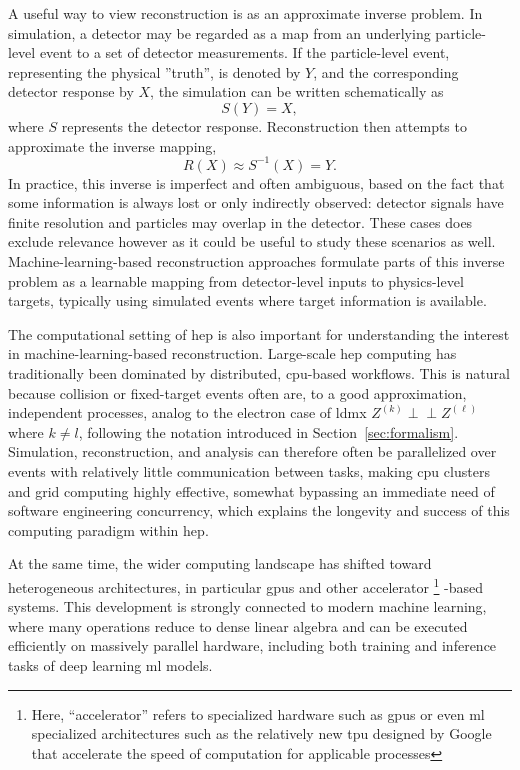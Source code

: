 A useful way to view reconstruction is as an approximate inverse problem. In simulation, a detector may be regarded as a map from an underlying particle-level event to a set of detector measurements. If the particle-level event, representing the physical ''truth'', is denoted by \(Y\), and the corresponding detector response by \(X\), the simulation can be written schematically as
\begin{equation}
    S(Y) = X ,
\end{equation}
where \(S\) represents the detector response. Reconstruction then attempts to approximate the inverse mapping,
\begin{equation}
    R(X) \approx S^{-1}(X) = Y .
\end{equation}
In practice, this inverse is imperfect and often ambiguous, based on the fact that some information is always lost or only indirectly observed: detector signals have finite resolution and particles may overlap in the detector. These cases does exclude relevance however as it could be useful to study these scenarios as well. Machine-learning-based reconstruction approaches formulate parts of this inverse problem as a learnable mapping from detector-level inputs to physics-level targets, typically using simulated events where target information is available.

The computational setting of \gls{hep} is also important for understanding the interest in machine-learning-based reconstruction. Large-scale \gls{hep} computing has traditionally been dominated by distributed, \gls{cpu}-based workflows. \cite{sur2026-heterogeneous-computing} This is natural because collision or fixed-target events often are, to a good approximation, independent processes, analog to the electron case of \gls{ldmx} $Z^{(k)} \perp\!\!\!\perp Z^{(\ell)}$ where $k \neq l$, following the notation introduced in Section~\ref{sec:formalism}. Simulation, reconstruction, and analysis can therefore often be parallelized over events with relatively little communication between tasks, making \gls{cpu} clusters and grid computing highly effective, somewhat bypassing an immediate need of software engineering concurrency, which explains the longevity and success of this computing paradigm within \gls{hep}.

At the same time, the wider computing landscape has shifted toward heterogeneous architectures, in particular \glspl{gpu} and other accelerator \footnote{Here, ``accelerator'' refers to specialized hardware such as \glspl{gpu} or even \gls{ml} specialized architectures such as the relatively new \gls{tpu} designed by Google that accelerate the speed of computation for applicable processes\cite{needed}}
-based systems. This development is strongly connected to modern machine learning, where many operations reduce to dense linear algebra and can be executed efficiently on massively parallel hardware, including both training and inference tasks of deep learning \gls{ml} models.

